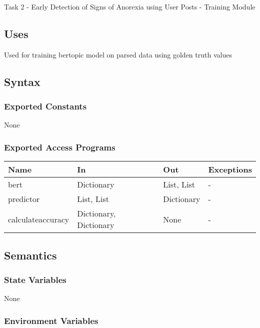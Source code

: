 \documentclass[12pt, titlepage]{article}
\begin{document}
Task 2 - Early Detection of Signs of Anorexia using User Posts - Training Module

\subsection{Uses}

Used for training bertopic model on parsed data using golden truth values

\subsection{Syntax}

\subsubsection{Exported Constants}

None

\subsubsection{Exported Access Programs}

\begin{center}
\begin{tabular}{p{3.5cm} p{4.5cm} p{3cm} p{2cm}}
\hline
\textbf{Name} & \textbf{In} & \textbf{Out} & \textbf{Exceptions} \\
\hline
bert & Dictionary & List, List & - \\
predictor & List, List & Dictionary & - \\
calculateaccuracy & Dictionary, Dictionary & None & - \\
\hline
\end{tabular}
\end{center}

\subsection{Semantics}

\subsubsection{State Variables}

None

\subsubsection{Environment Variables}
\end{document}

